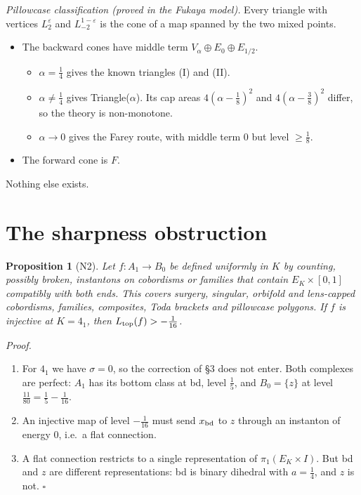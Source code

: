 \documentclass[10pt]{amsart}
\newcommand{\st}[1]{\par\noindent\textit{#1}\enspace}
\newtheorem*{prop}{Proposition}
\begin{document}
\st{Pillowcase classification (proved in the Fukaya model).} Every triangle with vertices
$L_2^\varepsilon$ and $L_{-2}^{1-\varepsilon}$ is the cone of a map spanned by the two
mixed points.
\begin{itemize}
\item The backward cones have middle term $V_\alpha\oplus E_0\oplus E_{1/2}$.
  \begin{itemize}
  \item $\alpha=\frac14$ gives the known triangles (I) and (II).
  \item $\alpha\ne\frac14$ gives Triangle($\alpha$). Its cap areas $4(\alpha-\frac18)^2$ and $4(\alpha-\frac38)^2$ differ, so the theory is non-monotone.
  \item $\alpha\to0$ gives the Farey route, with middle term $0$ but level $\ge\frac18$.
  \end{itemize}
\item The forward cone is $F$.
\end{itemize}
Nothing else exists.

\section{The sharpness obstruction}

\begin{prop}[N2]
Let $f\colon A_1\to B_0$ be defined uniformly in $K$ by counting, possibly broken, instantons
on cobordisms or families that contain $E_K\times[0,1]$ compatibly with both ends. This covers
surgery, singular, orbifold and lens-capped cobordisms, families, composites, Toda brackets and
pillowcase polygons. If $f$ is injective at $K=4_1$, then $L_{\rm top}(f)>-\frac1{16}$.
\end{prop}

\noindent\emph{Proof.}
\begin{enumerate}
\item For $4_1$ we have $\sigma=0$, so the correction of \S3 does not enter. Both complexes are perfect: $A_1$ has its bottom class at bd, level $\frac15$, and $B_0=\{z\}$ at level $\frac{11}{80}=\frac15-\frac1{16}$.
\item An injective map of level $-\frac1{16}$ must send $x_{\rm bd}$ to $z$ through an instanton of energy $0$, i.e.\ a flat connection.
\item A flat connection restricts to a single representation of $\pi_1(E_K\times I)$. But bd and $z$ are different representations: bd is binary dihedral with $a=\frac14$, and $z$ is not. $\square$
\end{enumerate}
\end{document}
